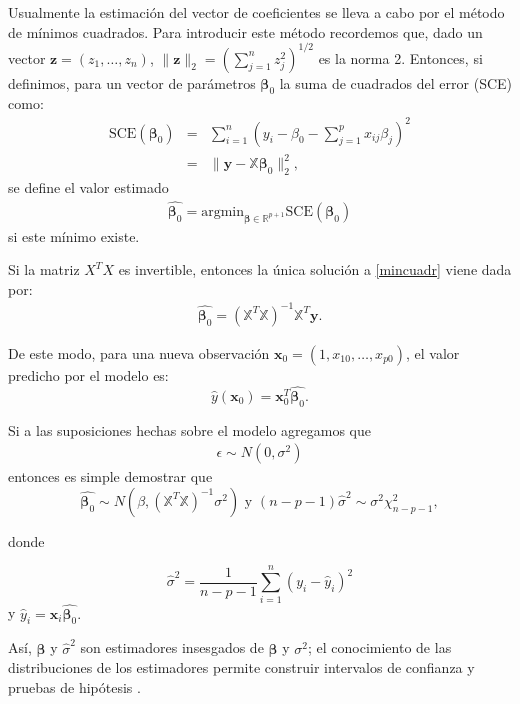 \documentclass{report}
\begin{document}
 Usualmente la estimación del vector de coeficientes se lleva a cabo  por el método de mínimos cuadrados. Para introducir este método recordemos que,  dado un vector  $\mathbf{z}=(z_1,\ldots,z_n)$,   $\|\mathbf{z}\|_2=(\sum_{j=1}^nz_j^2)^{1/2}$ es la norma 2. Entonces, si definimos, para un vector de parámetros  $\boldsymbol{\beta}_0$ la suma de cuadrados del error (SCE) como:
\begin{eqnarray}\label{sce}
\text{SCE}(\boldsymbol{\beta}_0)&=&\sum_{i=1}^n\left(y_i-\beta_0-\sum_{j=1}^p x_{i j} \beta_j\right)^2\\ 
&=&\|\mathbf{y}-\mathbb{X} \boldsymbol{\beta}_0\|_2^2,\nonumber 
\end{eqnarray}
se define el valor estimado 
\begin{eqnarray}\label{mincuadr}
\widehat{\boldsymbol{\beta}_0}=\text{argmin}_ {\boldsymbol{\beta} \in \mathbb{R}^{p+1}}\text{SCE}(\boldsymbol{\beta}_0)
\end{eqnarray}
si este mínimo existe.  


 Si la matriz $X^TX$ es invertible, entonces la única solución a \eqref{mincuadr} viene dada por:
\begin{eqnarray}\label{mincuadrsolu}
	\widehat{\boldsymbol{\beta}_0}=(\mathbb{X}^T\mathbb{X})^{-1}\mathbb{X}^T\mathbf{y}.
\end{eqnarray}

 De este modo, para una nueva observación $\mathbf{x}_0=\left(1,x_{10}, \ldots, x_{p0}\right)$, el valor predicho por el modelo es:
$$\widehat{y}(\mathbf{x}_0)=\mathbf{x}_0^T	\widehat{\boldsymbol{\beta}_0}.$$


 Si a las suposiciones hechas sobre el modelo agregamos que 
\begin{eqnarray}\label{modelonorm}
\epsilon \sim N(0,\sigma^2)
\end{eqnarray}
entonces es simple demostrar que 
$$
\widehat{\boldsymbol{\beta}_0} \sim N\left(\beta,\left(\mathbb{X}^T \mathbb{X}\right)^{-1} \sigma^2\right)  \text{ y } (n-p-1) \hat{\sigma}^2 \sim \sigma^2 \chi_{n-p-1}^2,$$ 

donde 

$$
\hat{\sigma}^2=\frac{1}{n-p-1} \sum_{i=1}^n\left(y_i-\hat{y}_i\right)^2 
$$
y $\widehat{y}_i=\mathbf{x}_i \widehat{\boldsymbol{\beta}_0}.$  


 Así,  $\widehat{\boldsymbol{\beta}}$ y $\hat{\sigma}^2$ son estimadores insesgados de  $ \boldsymbol{\beta} $ y $ \sigma^2$; el conocimiento de las distribuciones de los estimadores permite construir intervalos de confianza y pruebas de hipótesis \citep{htf}. 
\end{document}

